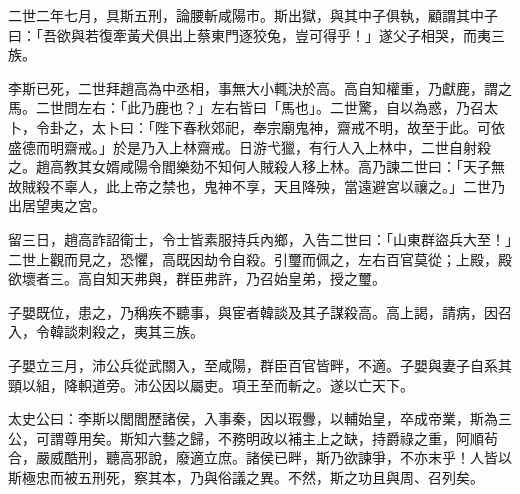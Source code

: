 \begin{pinyinscope}
二世二年七月，具斯五刑，論腰斬咸陽市。斯出獄，與其中子俱執，顧謂其中子曰：「吾欲與若復牽黃犬俱出上蔡東門逐狡兔，豈可得乎！」遂父子相哭，而夷三族。

李斯已死，二世拜趙高為中丞相，事無大小輒決於高。高自知權重，乃獻鹿，謂之馬。二世問左右：「此乃鹿也？」左右皆曰「馬也」。二世驚，自以為惑，乃召太卜，令卦之，太卜曰：「陛下春秋郊祀，奉宗廟鬼神，齋戒不明，故至于此。可依盛德而明齋戒。」於是乃入上林齋戒。日游弋獵，有行人入上林中，二世自射殺之。趙高教其女婿咸陽令閻樂劾不知何人賊殺人移上林。高乃諫二世曰：「天子無故賊殺不辜人，此上帝之禁也，鬼神不享，天且降殃，當遠避宮以禳之。」二世乃出居望夷之宮。

留三日，趙高詐詔衛士，令士皆素服持兵內鄉，入告二世曰：「山東群盜兵大至！」二世上觀而見之，恐懼，高既因劫令自殺。引璽而佩之，左右百官莫從；上殿，殿欲壞者三。高自知天弗與，群臣弗許，乃召始皇弟，授之璽。

子嬰既位，患之，乃稱疾不聽事，與宦者韓談及其子謀殺高。高上謁，請病，因召入，令韓談刺殺之，夷其三族。

子嬰立三月，沛公兵從武關入，至咸陽，群臣百官皆畔，不適。子嬰與妻子自系其頸以組，降軹道旁。沛公因以屬吏。項王至而斬之。遂以亡天下。

太史公曰：李斯以閭閻歷諸侯，入事秦，因以瑕釁，以輔始皇，卒成帝業，斯為三公，可謂尊用矣。斯知六藝之歸，不務明政以補主上之缺，持爵祿之重，阿順茍合，嚴威酷刑，聽高邪說，廢適立庶。諸侯已畔，斯乃欲諫爭，不亦末乎！人皆以斯極忠而被五刑死，察其本，乃與俗議之異。不然，斯之功且與周、召列矣。


\end{pinyinscope}